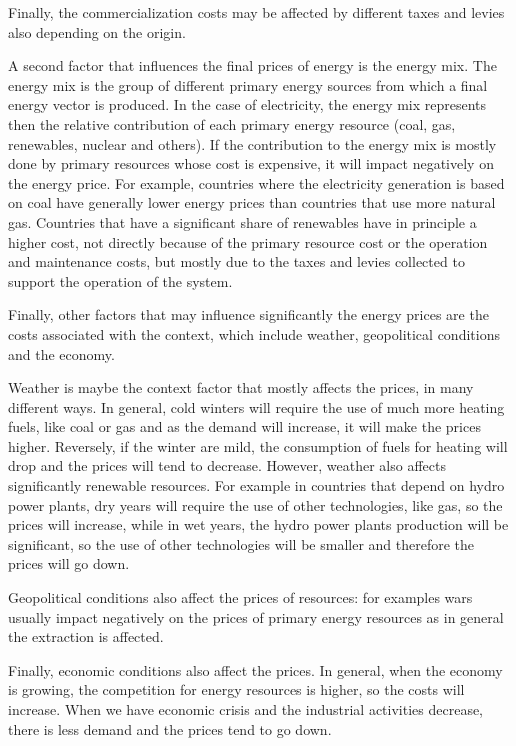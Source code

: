 \documentclass[]{book}
\theoremstyle{definition}
\theoremstyle{definition}
\theoremstyle{definition}
\theoremstyle{remark}
\begin{document}
Finally, the commercialization costs may be affected by different taxes
and levies also depending on the origin.

A second factor that influences the final prices of energy is the energy
mix. The energy mix is the group of different primary energy sources
from which a final energy vector is produced. In the case of
electricity, the energy mix represents then the relative contribution of
each primary energy resource (coal, gas, renewables, nuclear and
others). If the contribution to the energy mix is mostly done by primary
resources whose cost is expensive, it will impact negatively on the
energy price. For example, countries where the electricity generation is
based on coal have generally lower energy prices than countries that use
more natural gas. Countries that have a significant share of renewables
have in principle a higher cost, not directly because of the primary
resource cost or the operation and maintenance costs, but mostly due to
the taxes and levies collected to support the operation of the system.

Finally, other factors that may influence significantly the energy
prices are the costs associated with the context, which include weather,
geopolitical conditions and the economy.

Weather is maybe the context factor that mostly affects the prices, in
many different ways. In general, cold winters will require the use of
much more heating fuels, like coal or gas and as the demand will
increase, it will make the prices higher. Reversely, if the winter are
mild, the consumption of fuels for heating will drop and the prices will
tend to decrease. However, weather also affects significantly renewable
resources. For example in countries that depend on hydro power plants,
dry years will require the use of other technologies, like gas, so the
prices will increase, while in wet years, the hydro power plants
production will be significant, so the use of other technologies will be
smaller and therefore the prices will go down.

Geopolitical conditions also affect the prices of resources: for
examples wars usually impact negatively on the prices of primary energy
resources as in general the extraction is affected.

Finally, economic conditions also affect the prices. In general, when
the economy is growing, the competition for energy resources is higher,
so the costs will increase. When we have economic crisis and the
industrial activities decrease, there is less demand and the prices tend
to go down.
\end{document}
